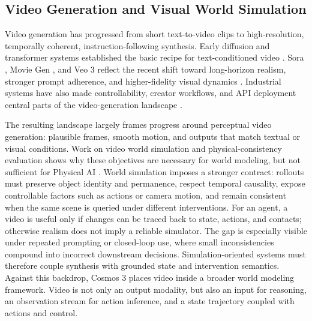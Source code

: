 \documentclass{llmxive}
\begin{document}
\subsection{Video Generation and Visual World Simulation}
Video generation has progressed from short text-to-video clips to high-resolution, temporally coherent, instruction-following synthesis.
Early diffusion and transformer systems established the basic recipe for text-conditioned video \citep{ho2022video,singer2022makeavideo,ho2022imagen,villegas2022phenaki,blattmann2023stablevideo,bartal2024lumiere,hacohen2024ltx,videopoet,emuvideo,yang2024cogvideox,opensora2,mochi1,waver}.
Sora \citep{sora,sora2}, Movie Gen \citep{polyak2024movie}, and Veo 3 \citep{veo3,veo31} reflect the recent shift toward long-horizon realism, stronger prompt adherence, and higher-fidelity visual dynamics \citep{kong2024hunyuanvideo,wan2025,gao2025seedance,arkhipkin2025kandinsky}.
Industrial systems have also made controllability, creator workflows, and API deployment central parts of the video-generation landscape \citep{gen3,runway_gen4,kling,kling2,dreammachine,ray2,minimax,hailuo02,pika,firefly_video,nova_reel}.

The resulting landscape largely frames progress around perceptual video generation: plausible frames, smooth motion, and outputs that match textual or visual conditions.
Work on video world simulation and physical-consistency evaluation shows why these objectives are necessary for world modeling, but not sufficient for Physical AI \citep{he2025pre,bansal2024videophy,guo2025t2vphysbench,motamed2025generative}.
World simulation imposes a stronger contract: rollouts must preserve object identity and permanence, respect temporal causality, expose controllable factors such as actions or camera motion, and remain consistent when the same scene is queried under different interventions.
For an agent, a video is useful only if changes can be traced back to state, actions, and contacts; otherwise realism does not imply a reliable simulator.
The gap is especially visible under repeated prompting or closed-loop use, where small inconsistencies compound into incorrect downstream decisions.
Simulation-oriented systems must therefore couple synthesis with grounded state and intervention semantics.
Against this backdrop, Cosmos 3 places video inside a broader world modeling framework.
Video is not only an output modality, but also an input for reasoning, an observation stream for action inference, and a state trajectory coupled with actions and control.
\end{document}
